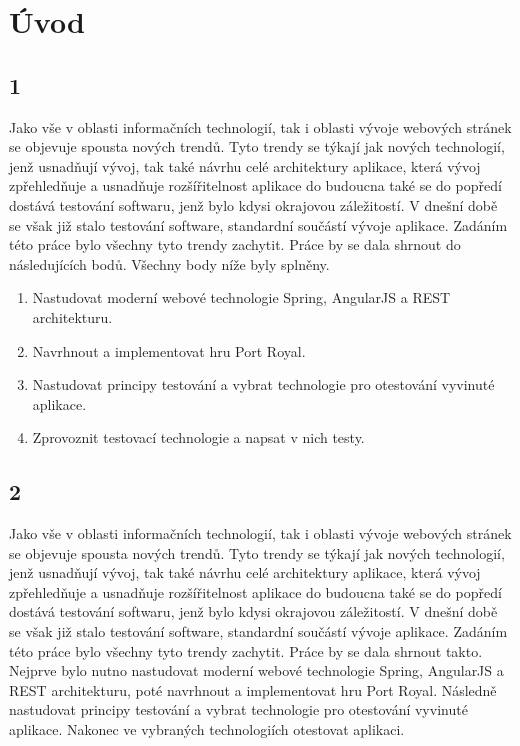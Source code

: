 \documentclass[czech,master,public,dept460,male,cpdeclaration,twoside]{diploma}
\begin{document}
\MakeTitlePages

\lstlistoflistings

\section{Úvod}
\subsection{1}
Jako vše v oblasti informačních technologií, tak i oblasti vývoje webových stránek se objevuje spousta nových trendů. Tyto trendy se týkají jak nových technologií, jenž usnadňují vývoj, tak také návrhu celé architektury aplikace, která vývoj zpřehledňuje a usnadňuje rozšířitelnost aplikace do budoucna také se do popředí dostává testování softwaru, jenž bylo kdysi okrajovou záležitostí. V dnešní době se však již stalo testování software, standardní součástí vývoje aplikace. Zadáním této práce bylo všechny tyto trendy zachytit. Práce by se dala shrnout do následujících bodů. Všechny body níže byly splněny.

\begin{enumerate}
	\item Nastudovat moderní webové technologie Spring, AngularJS a REST architekturu.
	\item Navrhnout a implementovat hru Port Royal.
	\item Nastudovat principy testování a vybrat technologie pro otestování vyvinuté aplikace.
	\item Zprovoznit testovací technologie a napsat v nich testy.
\end{enumerate}


\subsection{2}
Jako vše v oblasti informačních technologií, tak i oblasti vývoje webových stránek se objevuje spousta nových trendů. Tyto trendy se týkají jak nových technologií, jenž usnadňují vývoj, tak také návrhu celé architektury aplikace, která vývoj zpřehledňuje a usnadňuje rozšířitelnost aplikace do budoucna také se do popředí dostává testování softwaru, jenž bylo kdysi okrajovou záležitostí. V dnešní době se však již stalo testování software, standardní součástí vývoje aplikace. Zadáním této práce bylo všechny tyto trendy zachytit. Práce by se dala shrnout takto. Nejprve bylo nutno nastudovat moderní webové technologie Spring, AngularJS a REST architekturu, poté navrhnout a implementovat hru Port Royal. Následně nastudovat principy testování a vybrat technologie pro otestování vyvinuté aplikace. Nakonec ve vybraných technologiích otestovat aplikaci.
\end{document}
